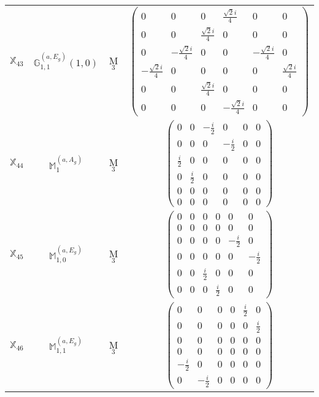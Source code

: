 \documentclass[fleqn,10pt,landscape]{article}
\begin{document}
\begin{itemize}
\begin{center}
\begin{longtable}{c|c|c|c}
$ \mathbb{X}_{43} $ & $\mathbb{G}_{1,1}^{(a,E_{g})}(1,0)$ & M$_{3}$ & $\begin{pmatrix} 0 & 0 & 0 & \frac{\sqrt{2} i}{4} & 0 & 0 \\ 0 & 0 & \frac{\sqrt{2} i}{4} & 0 & 0 & 0 \\ 0 & - \frac{\sqrt{2} i}{4} & 0 & 0 & - \frac{\sqrt{2} i}{4} & 0 \\ - \frac{\sqrt{2} i}{4} & 0 & 0 & 0 & 0 & \frac{\sqrt{2} i}{4} \\ 0 & 0 & \frac{\sqrt{2} i}{4} & 0 & 0 & 0 \\ 0 & 0 & 0 & - \frac{\sqrt{2} i}{4} & 0 & 0 \end{pmatrix}$ \\
$ \mathbb{X}_{44} $ & $\mathbb{M}_{1}^{(a,A_{g})}$ & M$_{3}$ & $\begin{pmatrix} 0 & 0 & - \frac{i}{2} & 0 & 0 & 0 \\ 0 & 0 & 0 & - \frac{i}{2} & 0 & 0 \\ \frac{i}{2} & 0 & 0 & 0 & 0 & 0 \\ 0 & \frac{i}{2} & 0 & 0 & 0 & 0 \\ 0 & 0 & 0 & 0 & 0 & 0 \\ 0 & 0 & 0 & 0 & 0 & 0 \end{pmatrix}$ \\
$ \mathbb{X}_{45} $ & $\mathbb{M}_{1,0}^{(a,E_{g})}$ & M$_{3}$ & $\begin{pmatrix} 0 & 0 & 0 & 0 & 0 & 0 \\ 0 & 0 & 0 & 0 & 0 & 0 \\ 0 & 0 & 0 & 0 & - \frac{i}{2} & 0 \\ 0 & 0 & 0 & 0 & 0 & - \frac{i}{2} \\ 0 & 0 & \frac{i}{2} & 0 & 0 & 0 \\ 0 & 0 & 0 & \frac{i}{2} & 0 & 0 \end{pmatrix}$ \\
$ \mathbb{X}_{46} $ & $\mathbb{M}_{1,1}^{(a,E_{g})}$ & M$_{3}$ & $\begin{pmatrix} 0 & 0 & 0 & 0 & \frac{i}{2} & 0 \\ 0 & 0 & 0 & 0 & 0 & \frac{i}{2} \\ 0 & 0 & 0 & 0 & 0 & 0 \\ 0 & 0 & 0 & 0 & 0 & 0 \\ - \frac{i}{2} & 0 & 0 & 0 & 0 & 0 \\ 0 & - \frac{i}{2} & 0 & 0 & 0 & 0 \end{pmatrix}$ \\

\end{longtable}
\end{center}
\end{itemize}
\end{document}
